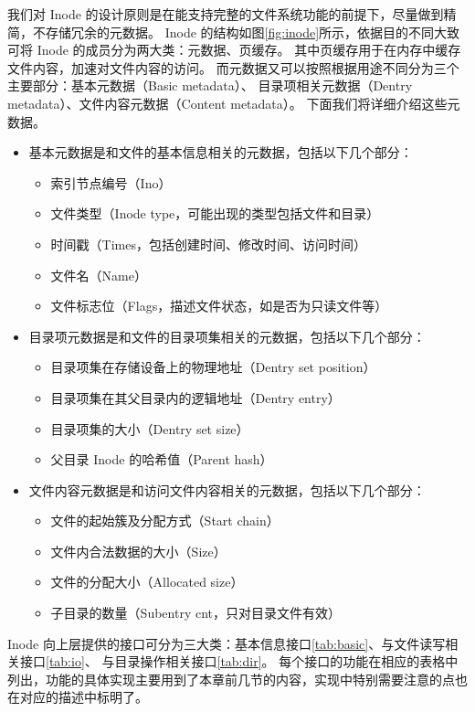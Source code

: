 我们对 Inode 的设计原则是在能支持完整的文件系统功能的前提下，尽量做到精简，不存储冗余的元数据。
Inode 的结构如图\ref{fig:inode}所示，依据目的不同大致可将 Inode 的成员分为两大类：元数据、页缓存。
其中页缓存用于在内存中缓存文件内容，加速对文件内容的访问。
而元数据又可以按照根据用途不同分为三个主要部分：基本元数据（Basic metadata）、
目录项相关元数据（Dentry metadata）、文件内容元数据（Content metadata）。
下面我们将详细介绍这些元数据。
\begin{itemize}
    \item 基本元数据是和文件的基本信息相关的元数据，包括以下几个部分：
    \begin{itemize} 
        \item 索引节点编号（Ino）
        \item 文件类型（Inode type，可能出现的类型包括文件和目录）
        \item 时间戳（Times，包括创建时间、修改时间、访问时间）
        \item 文件名（Name）
        \item 文件标志位（Flags，描述文件状态，如是否为只读文件等）
    \end{itemize}
    \item 目录项元数据是和文件的目录项集相关的元数据，包括以下几个部分：
    \begin{itemize} 
        \item 目录项集在存储设备上的物理地址（Dentry set position）
        \item 目录项集在其父目录内的逻辑地址（Dentry entry）
        \item 目录项集的大小（Dentry set size）
        \item 父目录 Inode 的哈希值（Parent hash）
    \end{itemize}
    \item 文件内容元数据是和访问文件内容相关的元数据，包括以下几个部分：
    \begin{itemize} 
        \item 文件的起始簇及分配方式（Start chain）
        \item 文件内合法数据的大小（Size）
        \item 文件的分配大小（Allocated size）
        \item 子目录的数量（Subentry cnt，只对目录文件有效）
    \end{itemize}
\end{itemize}

Inode 向上层提供的接口可分为三大类：基本信息接口\ref{tab:basic}、与文件读写相关接口\ref{tab:io}、
与目录操作相关接口\ref{tab:dir}。
每个接口的功能在相应的表格中列出，功能的具体实现主要用到了本章前几节的内容，实现中特别需要注意的点也在对应的描述中标明了。

